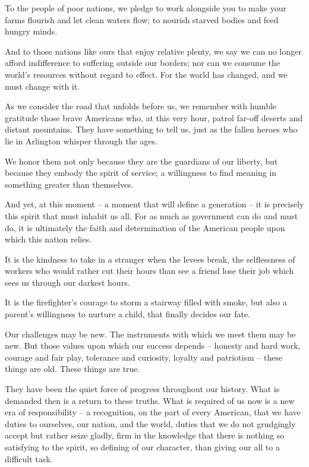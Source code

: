 To the people of poor nations, we pledge to work alongside you to make your farms flourish and let clean waters flow; to nourish starved bodies and feed 
hungry minds.

And to those nations like ours that enjoy relative plenty, we say we can no longer afford indifference to suffering outside our borders; nor can we consume the 
world’s resources without regard to effect. For the world has changed, and we must change with it.

As we consider the road that unfolds before us, we remember with humble gratitude those brave Americans who, at this very hour, patrol far-off deserts and 
distant mountains. They have something to tell us, just as the fallen heroes who lie in Arlington whisper through the ages.


We honor them not only because they are the guardians of our liberty, but because they embody the spirit of service; a willingness to find meaning in 
something greater than themselves.

And yet, at this moment – a moment that will define a generation – it is precisely this spirit that must inhabit us all. For as much as government can do and 
must do, it is ultimately the faith and determination of the American people upon which this nation relies.

It is the kindness to take in a stranger when the levees break, the selflessness of workers who would rather cut their hours than see a friend lose their job 
which sees us through our darkest hours.

It is the firefighter’s courage to storm a stairway filled with smoke, but also a parent’s willingness to nurture a child, that finally decides our fate.


Our challenges may be new. The instruments with which we meet them may be new. But those values upon which our success depends – honesty and 
hard work, courage and fair play, tolerance and curiosity, loyalty and patriotism – these things are old. These things are true.

They have been the quiet force of progress throughout our history. What is demanded then is a return to these truths. What is required of us now is a new 
era of responsibility – a recognition, on the part of every American, that we have duties to ourselves, our nation, and the world, duties that we do not grudgingly 
accept but rather seize gladly, firm in the knowledge that there is nothing so satisfying to the spirit, so defining of our character, than giving our all to a difficult task.

